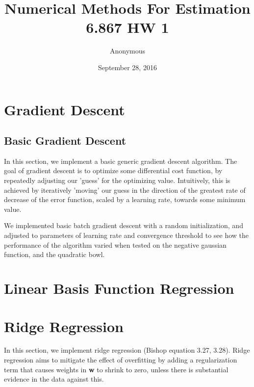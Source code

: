 \documentclass[11pt]{article}
\newcommand{\?}[0]{\vert}
\begin{document}
\title{Numerical Methods For Estimation\\
	6.867 HW 1}

\author{Anonymous}


\date{September 28, 2016}

\maketitle


\section{Gradient Descent}

\subsection{Basic Gradient Descent}

In this section, we implement a basic generic gradient descent algorithm. The goal of gradient descent is to optimize some differential cost function, by repeatedly adjusting our 'guess' for the optimizing value. Intuitively, this is achieved by iteratively 'moving' our guess in the direction of the greatest rate of decrease of the error function, scaled by a learning rate, towards some minimum value.


We implemented basic batch gradient descent with a random initialization, and adjusted to parameters of learning rate and convergence threshold to see how the performance of the algorithm varied when tested on the negative gaussian function, and the quadratic bowl.


\section{Linear Basis Function Regression}


\section{Ridge Regression}

In this section, we implement ridge regression (Bishop equation 3.27, 3.28). Ridge regression aims to mitigate the effect of overfitting by adding a regularization term that causes weights in \textbf{w} to shrink to zero, unless there is substantial evidence in the data against this.
\end{document}
